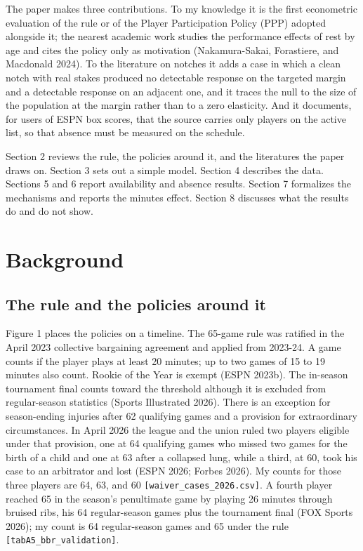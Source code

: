 \documentclass[11pt]{article}
\begin{document}
The paper makes three contributions. To my knowledge it is the first econometric evaluation of the rule or of the Player Participation Policy (PPP) adopted alongside it; the nearest academic work studies the performance effects of rest by age and cites the policy only as motivation (Nakamura-Sakai, Forastiere, and Macdonald 2024). To the literature on notches it adds a case in which a clean notch with real stakes produced no detectable response on the targeted margin and a detectable response on an adjacent one, and it traces the null to the size of the population at the margin rather than to a zero elasticity. And it documents, for users of ESPN box scores, that the source carries only players on the active list, so that absence must be measured on the schedule.

Section 2 reviews the rule, the policies around it, and the literatures the paper draws on. Section 3 sets out a simple model. Section 4 describes the data. Sections 5 and 6 report availability and absence results. Section 7 formalizes the mechanisms and reports the minutes effect. Section 8 discusses what the results do and do not show.


\section{Background}



\subsection*{The rule and the policies around it}


Figure 1 places the policies on a timeline. The 65-game rule was ratified in the April 2023 collective bargaining agreement and applied from 2023-24. A game counts if the player plays at least 20 minutes; up to two games of 15 to 19 minutes also count. Rookie of the Year is exempt (ESPN 2023b). The in-season tournament final counts toward the threshold although it is excluded from regular-season statistics (Sports Illustrated 2026). There is an exception for season-ending injuries after 62 qualifying games and a provision for extraordinary circumstances. In April 2026 the league and the union ruled two players eligible under that provision, one at 64 qualifying games who missed two games for the birth of a child and one at 63 after a collapsed lung, while a third, at 60, took his case to an arbitrator and lost (ESPN 2026; Forbes 2026). My counts for those three players are 64, 63, and 60 {\small\texttt{[waiver\_cases\_2026.csv]}}. A fourth player reached 65 in the season's penultimate game by playing 26 minutes through bruised ribs, his 64 regular-season games plus the tournament final (FOX Sports 2026); my count is 64 regular-season games and 65 under the rule {\small\texttt{[tabA5\_bbr\_validation]}}.
\end{document}
